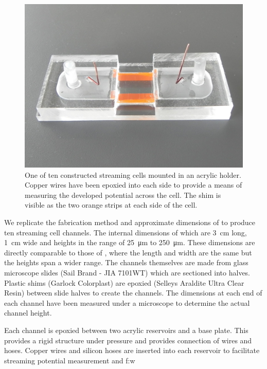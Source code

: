\documentclass[10pt,final,journal]{IEEEtran}
\begin{document}
    \begin{figure}
        \begin{center}
        \includegraphics[width=\linewidth]{Photo_streamingPotential_Assembly_Step3.JPG}
        \end{center}
        \caption{One of ten constructed streaming cells mounted in an acrylic holder. Copper wires have been epoxied into each side to provide a means of measuring the developed potential across the cell. The shim is visible as the two orange strips at each side of the cell.}
        \label{fig:cell}
    \end{figure}

    We replicate the fabrication method and approximate dimensions of \cite{Gu2000} to produce ten streaming cell channels.
    The internal dimensions of which are \SI{3}{\centi\metre} long, \SI{1}{\centi\metre} wide and heights in the range of \SI{25}{\micro\metre} to \SI{250}{\micro\metre}.
    These dimensions are directly comparable to those of \cite{Gu2000}, where the length and width are the same but the heights span a wider range.
    The channels themselves are made from glass microscope slides (Sail Brand - JIA 7101WT) which are sectioned into halves.
    Plastic shims (Garlock Colorplast) are epoxied (Selleys Araldite Ultra Clear Resin) between slide halves to create the channels.
    The dimensions at each end of each channel have been measured under a microscope to determine the actual channel height.

    Each channel is epoxied between two acrylic reservoirs and a base plate.
    This provides a rigid structure under pressure and provides connection of wires and hoses.
    Copper wires and silicon hoses are inserted into each reservoir to facilitate streaming potential measurement and f:w
\end{document}
